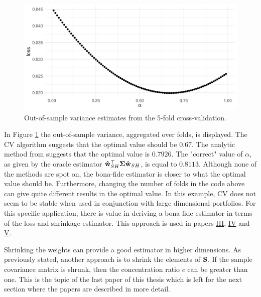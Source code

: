 \documentclass[12pt, twoside]{book}\usepackage{knitr}
\begin{document}
\begin{knitrout}\small
{}\color{fgcolor}\begin{figure}

{\centering \includegraphics[width=\maxwidth]{figure/cv_benchmark-1} 

}

\caption[Out-of-sample variance estimates from the 5-fold cross-validation]{Out-of-sample variance estimates from the 5-fold cross-validation.}\label{fig:cv_benchmark}
\end{figure}

\end{knitrout}

In Figure \ref{fig:cv_benchmark} the out-of-sample variance, aggregated over folds, is displayed. 
The CV algorithm suggests that the optimal value should be $0.67$. 
The analytic method from \citet{bodnar2018estimation} suggests that the optimal value is $0.7926$.
The "correct" value of $\alpha$, as given by the oracle estimator $\mathbf{\hat{w}}_{SH}^\top\mathbf{\Sigma} \mathbf{\hat{w}}_{SH}$, is equal to $0.8113$. 
Although none of the methods are spot on, the bona-fide estimator is closer to what the optimal value should be.
Furthermore, changing the number of folds in the code above can give quite different results in the optimal value.
In this example, CV does not seem to be stable when used in conjunction with large dimensional portfolios.
For this specific application, there is value in deriving a bona-fide estimator in terms of the loss and shrinkage estimator.
This approach is used in papers \hyperref[sec:paper3]{III}, \hyperref[sec:paper4]{IV} and \hyperref[sec:paper5]{V}.

Shrinking the weights can provide a good estimator in higher dimensions. 
As previously stated, another approach is to shrink the elements of $\mathbf{S}$.
If the sample covariance matrix is shrunk, then the concentration ratio $c$ can be greater than one.
This is the topic of the last paper of this thesis which is left for the next section where the papers are described in more detail.
\end{document}
